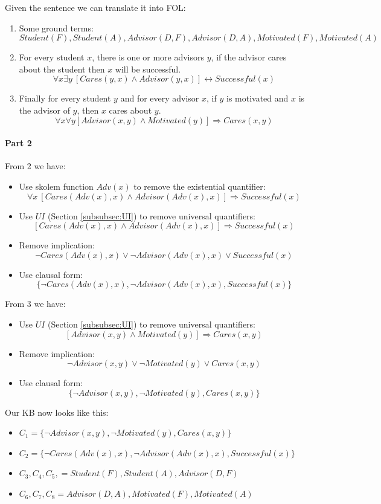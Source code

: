 \documentclass[10pt,a4paper]{article}
\begin{document}
\begin{itemize}
Given the sentence we can translate it into FOL:
\begin{enumerate}
\item Some ground terms:
\[Student(F),Student(A),Advisor(D,F),Advisor(D,A), Motivated(F),Motivated(A)\]
\item For every student $x$, there is one or more advisors $y$, if the advisor cares about the student then $x$ will be successful.
\[\forall x\exists y\ [Cares(y,x)\wedge Advisor(y,x)]\leftrightarrow Successful(x)\]
\item Finally for every student $y$ and for every advisor $x$, if $y$ is motivated and $x$ is the advisor of $y$, then $x$ cares about $y$.
\[\forall x \forall y [Advisor(x,y)\wedge Motivated(y)]\Rightarrow Cares(x,y)\]
\end{enumerate}

\paragraph{Part 2}

From 2 we have:
\begin{itemize}
\item Use skolem function $Adv(x)$ to remove the existential quantifier:
\[\forall x\ [Cares(Adv(x),x)\wedge Advisor(Adv(x),x)]\Rightarrow Successful(x)\]
\item Use $UI$ (Section \ref{subsubsec:UI}) to remove universal quantifiers:
\[ [Cares(Adv(x),x)\wedge Advisor(Adv(x),x)]\Rightarrow Successful(x)\]
\item Remove implication:
\[ \neg Cares(Adv(x),x)\vee \neg Advisor(Adv(x),x)\vee Successful(x)\]
\item Use clausal form:
\[\lbrace  \neg Cares(Adv(x),x), \neg Advisor(Adv(x),x), Successful(x)\rbrace\]
\end{itemize}


From 3 we have:
\begin{itemize}
\item Use $UI$ (Section \ref{subsubsec:UI}) to remove universal quantifiers:
\[ [Advisor(x,y)\wedge Motivated(y)]\Rightarrow Cares(x,y)\]
\item Remove implication:
\[ \neg Advisor(x,y)\vee \neg Motivated(y)\vee Cares(x,y)\]
\item Use clausal form:
\[ \lbrace \neg Advisor(x,y), \neg Motivated(y), Cares(x,y)\rbrace\]
\end{itemize}

Our KB now looks like this:
\begin{itemize}
\item $C_1=\lbrace \neg Advisor(x,y), \neg Motivated(y), Cares(x,y)\rbrace$
\item $C_2=\lbrace  \neg Cares(Adv(x),x), \neg Advisor(Adv(x),x), Successful(x)\rbrace$
\item $C_3,C_4,C_5,=Student(F),Student(A),Advisor(D,F)$
\item $C_6,C_7,C_8=Advisor(D,A), Motivated(F),Motivated(A)$
\end{itemize}


\end{itemize}
\end{document}
